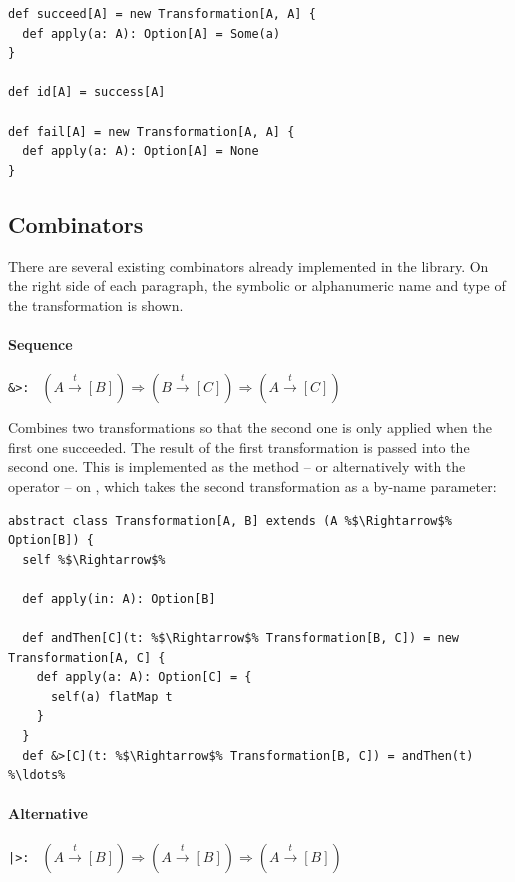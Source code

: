 \begin{lstlisting}
def succeed[A] = new Transformation[A, A] {
  def apply(a: A): Option[A] = Some(a)
}

def id[A] = success[A]

def fail[A] = new Transformation[A, A] {
  def apply(a: A): Option[A] = None
}
\end{lstlisting}

\subsection{Combinators}

There are several existing combinators already implemented in the library. On the right side of each paragraph, the symbolic or alphanumeric name and type of the transformation is shown.

\paragraph{Sequence} \hfill \lstinline{&>: } $(A \overset{t}{\rightarrow} [B]) \Rightarrow (B \overset{t}{\rightarrow} [C]) \Rightarrow (A \overset{t}{\rightarrow} [C])$

\vspace{7pt} Combines two transformations so that the second one is only applied when the first one succeeded. The result of the first transformation is passed into the second one. This is implemented as the  method -- or alternatively with the \src{\&>} operator -- on , which takes the second transformation as a by-name parameter:

\begin{lstlisting}
abstract class Transformation[A, B] extends (A %$\Rightarrow$% Option[B]) {
  self %$\Rightarrow$%

  def apply(in: A): Option[B]

  def andThen[C](t: %$\Rightarrow$% Transformation[B, C]) = new Transformation[A, C] {
    def apply(a: A): Option[C] = {
      self(a) flatMap t
    }
  }
  def &>[C](t: %$\Rightarrow$% Transformation[B, C]) = andThen(t)
%\ldots%
\end{lstlisting}


\paragraph{Alternative} \hfill \lstinline{|>: } $(A \overset{t}{\rightarrow} [B]) \Rightarrow (A \overset{t}{\rightarrow} [B]) \Rightarrow (A \overset{t}{\rightarrow} [B])$


